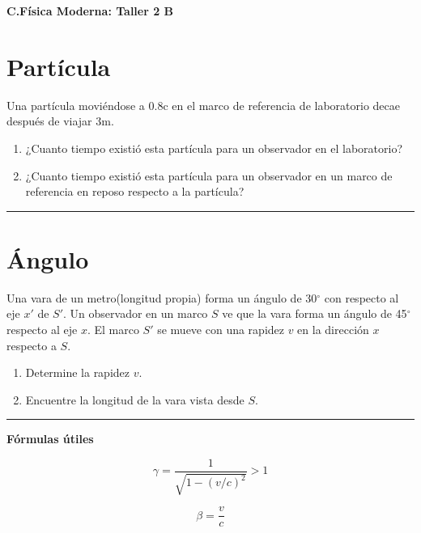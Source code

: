 \documentclass[12pt]{article}
\begin{document}
 
\begin{center}
\Large \textbf{C.Física Moderna: Taller 2 B}
\end{center}
 
  

\section{Partícula}
 
 
 Una partícula moviéndose a 0.8c en el marco de referencia de
 laboratorio decae después de viajar 3m.
 
 \begin{enumerate}
 	\item ¿Cuanto tiempo existió esta partícula para un observador en el laboratorio?
 	\item ¿Cuanto tiempo existió esta partícula para un observador en un marco de referencia en reposo respecto a la partícula?
 \end{enumerate}
 
\noindent\rule{16.5cm}{0.4pt}

\section{Ángulo}

Una vara de un metro(longitud propia) forma un ángulo de 30$^{\circ}$ con respecto al eje $x'$ de $S'$. 
Un observador en un marco $S$ ve que la vara forma un ángulo de 45$^{\circ}$ respecto al eje $x$. El marco $S'$ se mueve con una rapidez $v$ en la dirección $x$ respecto a $S$.

\begin{enumerate}
	\item Determine la rapidez $v$. 
	\item Encuentre la longitud de la vara vista desde $S$.
\end{enumerate}


\noindent\rule{16.5cm}{0.4pt}


\pagebreak

\textbf{Fórmulas útiles}

\begin{equation*}
\gamma = \frac{1}{\sqrt{1-(v/c)^2}} > 1
\end{equation*}
 
\begin{equation*}
\beta = \frac{v}{c}
\end{equation*}

 
\end{document}
